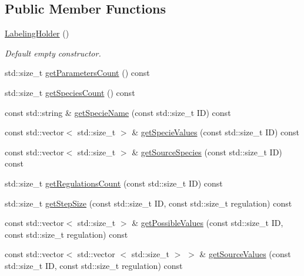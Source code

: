 \subsection*{\-Public \-Member \-Functions}
\begin{DoxyCompactItemize}
\item 
\hypertarget{classLabelingHolder_a6650bbd2ca3642b7733d7d7c986a8582}{\hyperlink{classLabelingHolder_a6650bbd2ca3642b7733d7d7c986a8582}{\-Labeling\-Holder} ()}\label{classLabelingHolder_a6650bbd2ca3642b7733d7d7c986a8582}

\begin{DoxyCompactList}\small\item\em \-Default empty constructor. \end{DoxyCompactList}\item 
std\-::size\-\_\-t \hyperlink{classLabelingHolder_a16cc2c15870a02f05e6a338ee451edd2}{get\-Parameters\-Count} () const 
\item 
std\-::size\-\_\-t \hyperlink{classLabelingHolder_a10c982727e0b71b5ac349cbc947d6dfe}{get\-Species\-Count} () const 
\item 
const std\-::string \& \hyperlink{classLabelingHolder_ac32b9124f9ff54b2e248bc07a249c78f}{get\-Specie\-Name} (const std\-::size\-\_\-t \-I\-D) const 
\item 
const std\-::vector$<$ std\-::size\-\_\-t $>$ \& \hyperlink{classLabelingHolder_a2bdbf8d0944eeb84d3cd2813f2795cf2}{get\-Specie\-Values} (const std\-::size\-\_\-t \-I\-D) const 
\item 
const std\-::vector$<$ std\-::size\-\_\-t $>$ \& \hyperlink{classLabelingHolder_aff60562d4517d58bd6be72afe0a04bed}{get\-Source\-Species} (const std\-::size\-\_\-t \-I\-D) const 
\item 
std\-::size\-\_\-t \hyperlink{classLabelingHolder_a7dcac5bcc2ffe7af9c81dd3d3856f6b6}{get\-Regulations\-Count} (const std\-::size\-\_\-t \-I\-D) const 
\item 
std\-::size\-\_\-t \hyperlink{classLabelingHolder_abd0a87a2878d1424c1e0d58a016e43d5}{get\-Step\-Size} (const std\-::size\-\_\-t \-I\-D, const std\-::size\-\_\-t regulation) const 
\item 
const std\-::vector$<$ std\-::size\-\_\-t $>$ \& \hyperlink{classLabelingHolder_a0ebe90fed8975996e71614919454b05e}{get\-Possible\-Values} (const std\-::size\-\_\-t \-I\-D, const std\-::size\-\_\-t regulation) const 
\item 
const std\-::vector$<$ std\-::vector\*
$<$ std\-::size\-\_\-t $>$ $>$ \& \hyperlink{classLabelingHolder_acc8f967132416e10fd6d4e5721093d87}{get\-Source\-Values} (const std\-::size\-\_\-t \-I\-D, const std\-::size\-\_\-t regulation) const 
\end{DoxyCompactItemize}
